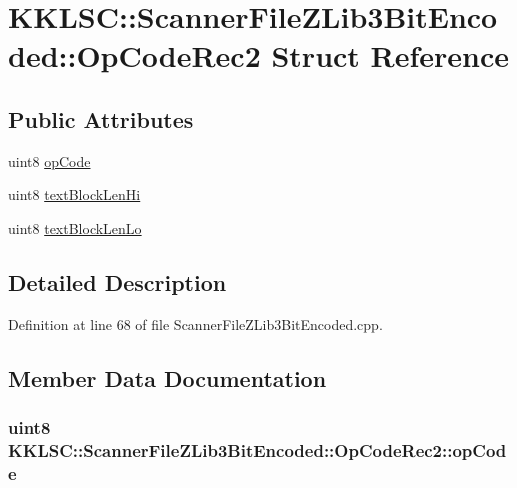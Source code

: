 \hypertarget{struct_scanner_file_z_lib3_bit_encoded_1_1_op_code_rec2}{}\section{K\+K\+L\+SC\+:\+:Scanner\+File\+Z\+Lib3\+Bit\+Encoded\+:\+:Op\+Code\+Rec2 Struct Reference}
\label{struct_scanner_file_z_lib3_bit_encoded_1_1_op_code_rec2}
\subsection*{Public Attributes}
\begin{DoxyCompactItemize}
\item 
uint8 \hyperlink{struct_scanner_file_z_lib3_bit_encoded_1_1_op_code_rec2_a20dd9945ae2dec7638c233e4c772dadf}{op\+Code}
\item 
uint8 \hyperlink{struct_scanner_file_z_lib3_bit_encoded_1_1_op_code_rec2_acfe4fd4ee3dd3549e1af9bf5237c66f4}{text\+Block\+Len\+Hi}
\item 
uint8 \hyperlink{struct_scanner_file_z_lib3_bit_encoded_1_1_op_code_rec2_abf0f3cea1d177ff8178b0475e79b23d3}{text\+Block\+Len\+Lo}
\end{DoxyCompactItemize}


\subsection{Detailed Description}


Definition at line 68 of file Scanner\+File\+Z\+Lib3\+Bit\+Encoded.\+cpp.



\subsection{Member Data Documentation}
\subsubsection[{\texorpdfstring{op\+Code}{opCode}}]{\setlength{\rightskip}{0pt plus 5cm}uint8 K\+K\+L\+S\+C\+::\+Scanner\+File\+Z\+Lib3\+Bit\+Encoded\+::\+Op\+Code\+Rec2\+::op\+Code}\hypertarget{struct_scanner_file_z_lib3_bit_encoded_1_1_op_code_rec2_a20dd9945ae2dec7638c233e4c772dadf}{}\label{struct_scanner_file_z_lib3_bit_encoded_1_1_op_code_rec2_a20dd9945ae2dec7638c233e4c772dadf}


